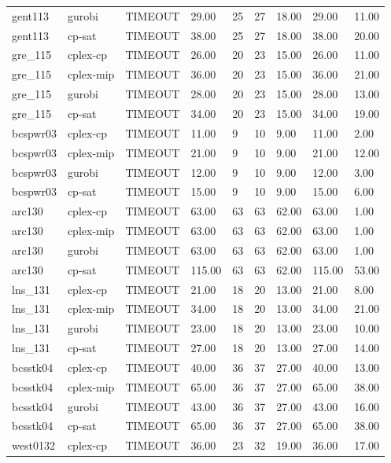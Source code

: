 \begin{tabular}{lllllllll}
gent113 & gurobi & TIMEOUT & 29.00 & 25 & 27 & 18.00 & 29.00 & 11.00 \\
gent113 & cp-sat & TIMEOUT & 38.00 & 25 & 27 & 18.00 & 38.00 & 20.00 \\
gre\_115 & cplex-cp & TIMEOUT & 26.00 & 20 & 23 & 15.00 & 26.00 & 11.00 \\
gre\_115 & cplex-mip & TIMEOUT & 36.00 & 20 & 23 & 15.00 & 36.00 & 21.00 \\
gre\_115 & gurobi & TIMEOUT & 28.00 & 20 & 23 & 15.00 & 28.00 & 13.00 \\
gre\_115 & cp-sat & TIMEOUT & 34.00 & 20 & 23 & 15.00 & 34.00 & 19.00 \\
bcspwr03 & cplex-cp & TIMEOUT & 11.00 & 9 & 10 & 9.00 & 11.00 & 2.00 \\
bcspwr03 & cplex-mip & TIMEOUT & 21.00 & 9 & 10 & 9.00 & 21.00 & 12.00 \\
bcspwr03 & gurobi & TIMEOUT & 12.00 & 9 & 10 & 9.00 & 12.00 & 3.00 \\
bcspwr03 & cp-sat & TIMEOUT & 15.00 & 9 & 10 & 9.00 & 15.00 & 6.00 \\
arc130 & cplex-cp & TIMEOUT & 63.00 & 63 & 63 & 62.00 & 63.00 & 1.00 \\
arc130 & cplex-mip & TIMEOUT & 63.00 & 63 & 63 & 62.00 & 63.00 & 1.00 \\
arc130 & gurobi & TIMEOUT & 63.00 & 63 & 63 & 62.00 & 63.00 & 1.00 \\
arc130 & cp-sat & TIMEOUT & 115.00 & 63 & 63 & 62.00 & 115.00 & 53.00 \\
lns\_131 & cplex-cp & TIMEOUT & 21.00 & 18 & 20 & 13.00 & 21.00 & 8.00 \\
lns\_131 & cplex-mip & TIMEOUT & 34.00 & 18 & 20 & 13.00 & 34.00 & 21.00 \\
lns\_131 & gurobi & TIMEOUT & 23.00 & 18 & 20 & 13.00 & 23.00 & 10.00 \\
lns\_131 & cp-sat & TIMEOUT & 27.00 & 18 & 20 & 13.00 & 27.00 & 14.00 \\
bcsstk04 & cplex-cp & TIMEOUT & 40.00 & 36 & 37 & 27.00 & 40.00 & 13.00 \\
bcsstk04 & cplex-mip & TIMEOUT & 65.00 & 36 & 37 & 27.00 & 65.00 & 38.00 \\
bcsstk04 & gurobi & TIMEOUT & 43.00 & 36 & 37 & 27.00 & 43.00 & 16.00 \\
bcsstk04 & cp-sat & TIMEOUT & 65.00 & 36 & 37 & 27.00 & 65.00 & 38.00 \\
west0132 & cplex-cp & TIMEOUT & 36.00 & 23 & 32 & 19.00 & 36.00 & 17.00 \\

\end{tabular}

